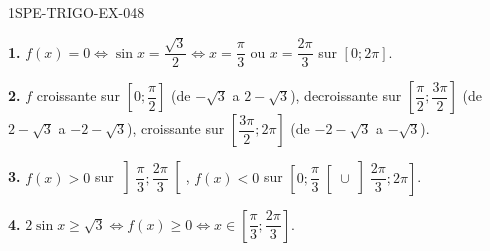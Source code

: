 \begin{corrige}{1SPE-TRIGO-EX-048}

\textbf{1.} $f(x) = 0 \iff \sin x = \dfrac{\sqrt{3}}{2} \iff x = \dfrac{\pi}{3}$ ou $x = \dfrac{2\pi}{3}$ sur $[0;2\pi]$.

\textbf{2.} $f$ croissante sur $\left[0;\dfrac{\pi}{2}\right]$ (de $-\sqrt{3}$ a $2-\sqrt{3}$), decroissante sur $\left[\dfrac{\pi}{2};\dfrac{3\pi}{2}\right]$ (de $2-\sqrt{3}$ a $-2-\sqrt{3}$), croissante sur $\left[\dfrac{3\pi}{2};2\pi\right]$ (de $-2-\sqrt{3}$ a $-\sqrt{3}$).

\textbf{3.} $f(x) > 0$ sur $\left]\dfrac{\pi}{3};\dfrac{2\pi}{3}\right[$, $f(x) < 0$ sur $\left[0;\dfrac{\pi}{3}\right[ \cup \left]\dfrac{2\pi}{3};2\pi\right]$.

\textbf{4.} $2\sin x \geqslant \sqrt{3} \iff f(x) \geqslant 0 \iff x \in \left[\dfrac{\pi}{3};\dfrac{2\pi}{3}\right]$.

\end{corrige}
